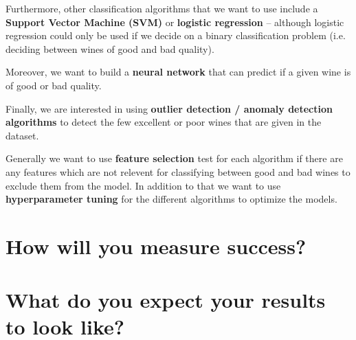 \documentclass[11pt,titlepage,oneside,openany]{book}
\begin{document}
Furthermore, other classification algorithms that we want to use include a \textbf{Support Vector Machine (SVM)}
or \textbf{logistic regression} -- although logistic regression could only be used if we decide on
a binary classification problem (i.e. deciding between wines of good and bad quality).

Moreover, we want to build a \textbf{neural network} that can predict if a given wine is of good or bad quality.

Finally, we are interested in using \textbf{outlier detection / anomaly detection algorithms} to detect the few 
excellent or poor wines that are given in the dataset.

Generally we want to use \textbf{feature selection} test for each algorithm if there are any features which are not relevent 
for classifying between good and bad wines to exclude them from the model. In addition to that we want to use 
\textbf{hyperparameter tuning} for the different algorithms to optimize the models.

\chapter{How will you measure success?}

\chapter{What do you expect your results to look like?}














\end{document}
